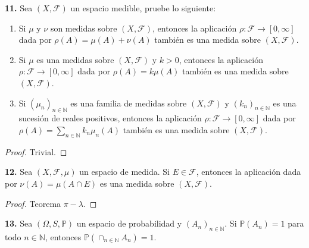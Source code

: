\documentclass{article}
\newenvironment{statement}[1]{\smallskip\noindent\color[rgb]{1.00,0.00,0.50} {\bf #1.}}{}
\theoremstyle{definition}
\theoremstyle{remark}
\newcommand{\BN}{\mathbb N}
\begin{document}
\begin{statement}{11}
  Sea $(X, \mathcal{F})$ un espacio medible, pruebe lo siguiente:
  \begin{enumerate}
    \item Si $\mu$ y $\nu$ son medidas sobre $(X, \mathcal{F})$, entonces la aplicaci\'on $\rho: \mathcal{F} \to [0, \infty]$ dada por $\rho(A) = \mu(A) + \nu(A)$ tambi\'en es una medida sobre $(X, \mathcal{F})$.
    \item Si $\mu$ es una medidas sobre $(X, \mathcal{F})$ y $k > 0$, entonces la aplicaci\'on $\rho: \mathcal{F} \to [0, \infty]$ dada por $\rho(A) = k \mu(A)$ tambi\'en es una medida sobre $(X, \mathcal{F})$.
    \item Si $(\mu_n)_{n \in \BN}$ es una familia de medidas sobre $(X, \mathcal{F})$ y $(k_n)_{n \in \BN}$ es una sucesi\'on de reales positivos, entonces la aplicaci\'on $\rho: \mathcal{F} \to [0, \infty]$ dada por $\rho(A) = \sum_{n \in \BN} k_n \mu_n(A)$ tambi\'en es una medida sobre $(X, \mathcal{F})$.
  \end{enumerate}
\end{statement}

\begin{proof}
  Trivial.
\end{proof}

\begin{statement}{12}
  Sea $(X, \mathcal{F}, \mu)$ un espacio de medida. Si $E \in \mathcal{F}$, entonces la aplicaci\'on dada por $\nu(A) = \mu(A \cap E)$ es una medida sobre $(X, \mathcal{F})$.
\end{statement}

\begin{proof}
  Teorema $\pi - \lambda$.
\end{proof}

\begin{statement}{13}
  Sea $(\Omega, S, \mathbb{P})$ un espacio de probabilidad y $(A_n)_{n \in \BN}$. Si $\mathbb{P}(A_n) = 1$ para todo $n \in \BN$, entonces $\mathbb{P}(\cap_{n \in \BN} A_n) = 1$.
\end{statement}
\end{document}
